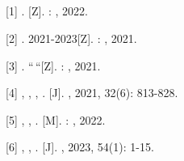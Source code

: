 \hypertarget{section-38}{%
\subsection{}\label{section-38}}

{[}1{]} . {[}Z{]}. : , 2022.

{[}2{]} . 2021-2023{[}Z{]}. : , 2021.

{[}3{]} . ``\,``{[}Z{]}. : , 2021.

{[}4{]} , , , . {[}J{]}. , 2021, 32(6): 813-828.

{[}5{]} , , . {[}M{]}. : , 2022.

{[}6{]} , , . {[}J{]}. , 2023, 54(1): 1-15.